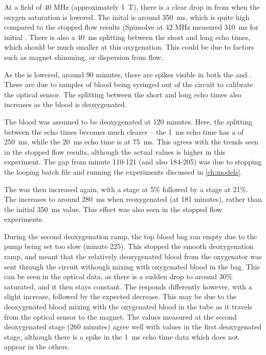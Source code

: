 At a field of 40 MHz (approximately \SI{1}{T}), there is a clear drop in \Ttwo from when the oxygen saturation is lowered.
The inital \Ttwo is around \SI{350}{ms}, which is quite high compared to the stopped flow results (Spinsolve at 42 MHz measured \SI{310}{ms} for initial \Ttwo.
There is also a \SI{40}{ms} splitting between the short and long echo times, which should be much smaller at this oxygenation.
This could be due to factors such as magnet shimming, or dispersion from flow.

As the \SOtwo is lowered, around 90 minutes, there are spikes visible in both the \Ttwo and \SOtwo.
These are due to samples of blood being syringed out of the circuit to calibrate the optical sensor.
The splitting between the short and long echo times also increases as the blood is deoxygenated.

The blood was assumed to be deoxygenated at 120 minutes.
Here, the splitting between the echo times becomes much clearer -- the \SI{1}{ms} echo time has a \Ttwo of \SI{250}{ms}, while the \SI{20}{ms} echo time is at \SI{75}{ms}.
This agrees with the trends seen in the stopped flow results, although the actual \Ttwo values is higher in this experiment.
The gap from minute 110-121 (and also 184-205) was due to stopping the looping batch file and running the experiments discussed in \autoref{ch:models}.

The \SOtwo was then increased again, with a stage at 5\% \Otwo followed by a stage at 21\%.
The \Ttwo increases to around \SI{280}{ms} when reoxygenated (at 181 minutes), rather than the initial \SI{350}{ms} value.
This effect was also seen in the stopped flow experiments.

During the second deoxygenation ramp, the top blood bag ran empty due to the pump being set too slow (minute 225).
This stopped the smooth deoxygenation ramp, and meant that the relatively deoxygenated blood from the oxygenator was sent through the circuit withough mixing with oxygenated blood in the bag.
This can be seen in the optical data, as there is a sudden drop to around 30\% saturated, and it then stays constant.
The \Ttwo responds differently however, with a slight increase, followed by the expected decrease.
This may be due to the deoxygenated blood mixing with the oxygenated blood in the tube as it travels from the optical sensor to the magnet.
The \Ttwo values measured at the second deoxygenated stage (260 minutes) agree well with values in the first deoxygenated stage, although there is a spike in the \SI{1}{ms} echo time data which does not appear in the others.

